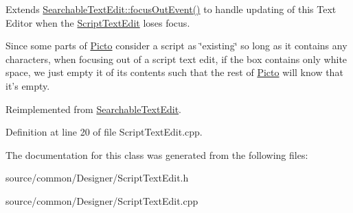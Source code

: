 Extends \hyperlink{class_searchable_text_edit_a8622cfa9536e40d76cfb1fb84f7ffc7c}{Searchable\-Text\-Edit\-::focus\-Out\-Event()} to handle updating of this Text Editor when the \hyperlink{class_script_text_edit}{Script\-Text\-Edit} loses focus. 

Since some parts of \hyperlink{namespace_picto}{Picto} consider a script as \char`\"{}existing\char`\"{} so long as it contains any characters, when focusing out of a script text edit, if the box contains only white space, we just empty it of its contents such that the rest of \hyperlink{namespace_picto}{Picto} will know that it's empty. 

Reimplemented from \hyperlink{class_searchable_text_edit_a8622cfa9536e40d76cfb1fb84f7ffc7c}{Searchable\-Text\-Edit}.



Definition at line 20 of file Script\-Text\-Edit.\-cpp.



The documentation for this class was generated from the following files\-:\begin{DoxyCompactItemize}
\item 
source/common/\-Designer/Script\-Text\-Edit.\-h\item 
source/common/\-Designer/Script\-Text\-Edit.\-cpp\end{DoxyCompactItemize}
